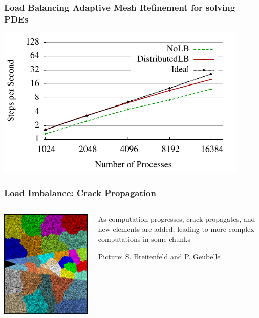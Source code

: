 \begin{frame}
\frametitle{Load Balancing Adaptive Mesh Refinement for solving PDEs}
\includegraphics[width=0.9\textwidth]{../figures/amr_scaling_distlb.pdf}
\end{frame}


\begin{frame}[fragile]
\frametitle{Load Imbalance: Crack Propagation}
\begin{columns}
\begin{column}{0.5\textwidth}
\includegraphics[width=\textwidth]{../figures/chunkGraph16}
\end{column}
\begin{column}{0.5\textwidth}
As computation progresses, crack propagates, and new elements are added, leading to more complex computations in some chunks

{\tiny Picture: S. Breitenfeld and P. Geubelle}
\end{column}
\end{columns}
\end{frame}


